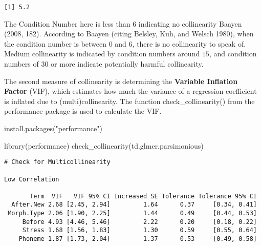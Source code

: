 \documentclass[
  10pt,
  letterpaper]{article}
\newenvironment{Shaded}{\begin{snugshade}}{\end{snugshade}}
\newcommand{\CommentTok}[1]{\textcolor[rgb]{0.37,0.37,0.37}{#1}}
\newcommand{\FunctionTok}[1]{\textcolor[rgb]{0.28,0.35,0.67}{#1}}
\newcommand{\NormalTok}[1]{\textcolor[rgb]{0.00,0.23,0.31}{#1}}
\newcommand{\SpecialCharTok}[1]{\textcolor[rgb]{0.37,0.37,0.37}{#1}}
\newcommand{\StringTok}[1]{\textcolor[rgb]{0.13,0.47,0.30}{#1}}
\renewcommand\texttt[1]{{\ttfamily\color{BrickRed}#1}}
\begin{document}
\begin{Shaded}
\end{Shaded}

\begin{verbatim}
[1] 5.2
\end{verbatim}

The Condition Number here is less than \(6\) indicating no collinearity
Baayen (2008, 182). According to Baayen (citing Belsley, Kuh, and Welsch
1980), when the condition number is between \(0\) and \(6\), there is no
collinearity to speak of. Medium collinearity is indicated by condition
numbers around \(15\), and condition numbers of \(30\) or more indicate
potentially harmful collinearity.

The second measure of collinearity is determining the \textbf{Variable
Inflation Factor} (VIF), which estimates how much the variance of a
regression coefficient is inflated due to (multi)collinearity. The
function \texttt{check\_collinearity()} from the \texttt{performance}
package is used to calculate the VIF.

\begin{Shaded}
\begin{Highlighting}[]
\FunctionTok{install.packages}\NormalTok{(}\StringTok{"performance"}\NormalTok{)}
\end{Highlighting}
\end{Shaded}

\begin{Shaded}
\begin{Highlighting}[]
\FunctionTok{library}\NormalTok{(performance)}
\FunctionTok{check\_collinearity}\NormalTok{(td.glmer.parsimonious)}
\end{Highlighting}
\end{Shaded}

\begin{verbatim}
# Check for Multicollinearity

Low Correlation

       Term  VIF   VIF 95% CI Increased SE Tolerance Tolerance 95% CI
  After.New 2.68 [2.45, 2.94]         1.64      0.37     [0.34, 0.41]
 Morph.Type 2.06 [1.90, 2.25]         1.44      0.49     [0.44, 0.53]
     Before 4.93 [4.46, 5.46]         2.22      0.20     [0.18, 0.22]
     Stress 1.68 [1.56, 1.83]         1.30      0.59     [0.55, 0.64]
    Phoneme 1.87 [1.73, 2.04]         1.37      0.53     [0.49, 0.58]
\end{verbatim}
\end{document}
